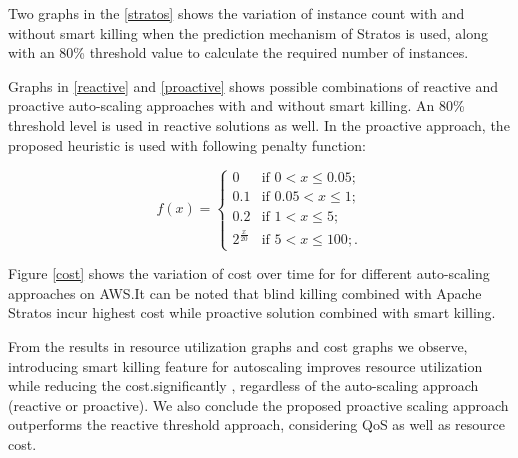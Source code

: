 Two graphs in the \ref{stratos} shows the variation of instance count with and without smart killing when the prediction mechanism of Stratos is used, along with an 80\% threshold value to calculate the required number of instances.

Graphs in \ref{reactive}  and \ref{proactive} shows possible combinations of reactive and proactive auto-scaling approaches with and without smart killing. An 80\% threshold level is used in reactive solutions as well. In the proactive approach, the proposed heuristic is used with following penalty function:

$$f(x) = \begin{cases} 
0 & \text{if $0 < x \le 0.05$}; \\
0.1 & \text{if $0.05 < x \le 1$}; \\
0.2 & \text{if $1 < x \le 5$};\\
2^{\frac{x}{20}} & \text{if $5 < x \le 100$};.\end{cases} $$


Figure \ref{cost} shows the variation of cost over time for for different auto-scaling approaches on AWS.It can be noted that blind killing combined with Apache Stratos incur highest cost while proactive solution combined with smart killing.

From the results in resource utilization graphs and cost graphs we observe, introducing smart killing feature for autoscaling improves resource utilization while reducing the cost.significantly , regardless of the auto-scaling approach (reactive or proactive). We also conclude the proposed proactive scaling approach outperforms the reactive threshold approach, considering QoS as well as resource cost.